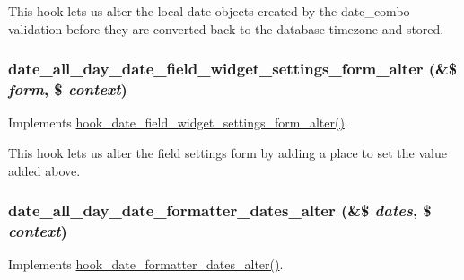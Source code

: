 This hook lets us alter the local date objects created by the date\_\-combo validation before they are converted back to the database timezone and stored. \hypertarget{date__all__day_8module_af94f4e37599b25e52892abb3b3f10a5f}{
\subsubsection[{date\_\-all\_\-day\_\-date\_\-field\_\-widget\_\-settings\_\-form\_\-alter}]{\setlength{\rightskip}{0pt plus 5cm}date\_\-all\_\-day\_\-date\_\-field\_\-widget\_\-settings\_\-form\_\-alter (\&\$ {\em form}, \/  \$ {\em context})}}
\label{date__all__day_8module_af94f4e37599b25e52892abb3b3f10a5f}
Implements \hyperlink{date_8api_8php_a0c2475c846f8750a83b95ea852bf42cf}{hook\_\-date\_\-field\_\-widget\_\-settings\_\-form\_\-alter()}.

This hook lets us alter the field settings form by adding a place to set the value added above. \hypertarget{date__all__day_8module_a1ab2c15d1dfed16ce758574dd9e3ccad}{
\subsubsection[{date\_\-all\_\-day\_\-date\_\-formatter\_\-dates\_\-alter}]{\setlength{\rightskip}{0pt plus 5cm}date\_\-all\_\-day\_\-date\_\-formatter\_\-dates\_\-alter (\&\$ {\em dates}, \/  \$ {\em context})}}
\label{date__all__day_8module_a1ab2c15d1dfed16ce758574dd9e3ccad}
Implements \hyperlink{date_8api_8php_aae52e9a3c4d3926f92ace9b0ec0041f4}{hook\_\-date\_\-formatter\_\-dates\_\-alter()}.

